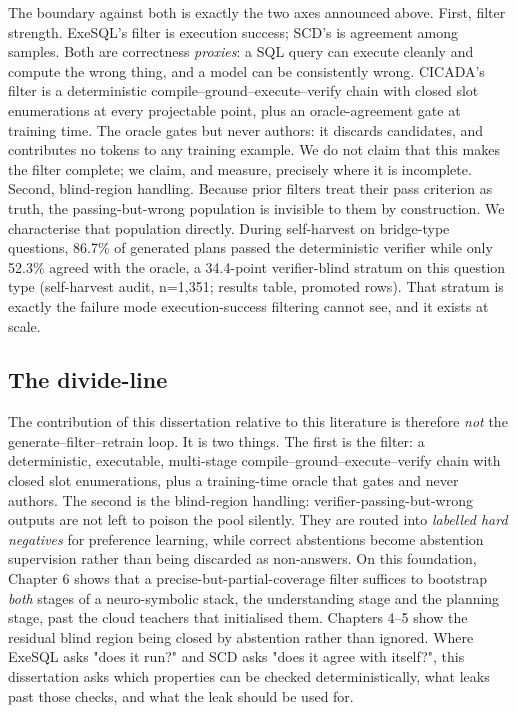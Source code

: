 \documentclass[10pt]{article} %
\begin{document}
The boundary against both is exactly the two axes announced above. First, filter strength. ExeSQL's filter is execution success; SCD's is agreement among samples. Both are correctness \emph{proxies}: a SQL query can execute cleanly and compute the wrong thing, and a model can be consistently wrong. CICADA's filter is a deterministic compile--ground--execute--verify chain with closed slot enumerations at every projectable point, plus an oracle-agreement gate at training time. The oracle gates but never authors: it discards candidates, and contributes no tokens to any training example. We do not claim that this makes the filter complete; we claim, and measure, precisely where it is incomplete. Second, blind-region handling. Because prior filters treat their pass criterion as truth, the passing-but-wrong population is invisible to them by construction. We characterise that population directly. During self-harvest on bridge-type questions, 86.7\% of generated plans passed the deterministic verifier while only 52.3\% agreed with the oracle, a 34.4-point verifier-blind stratum on this question type (self-harvest audit, n=1,351; results table, promoted rows). That stratum is exactly the failure mode execution-success filtering cannot see, and it exists at scale.

\subsection{The divide-line}\label{sec:the-divide-line}

The contribution of this dissertation relative to this literature is therefore \emph{not} the generate--filter--retrain loop. It is two things. The first is the filter: a deterministic, executable, multi-stage compile--ground--execute--verify chain with closed slot enumerations, plus a training-time oracle that gates and never authors. The second is the blind-region handling: verifier-passing-but-wrong outputs are not left to poison the pool silently. They are routed into \emph{labelled hard negatives} for preference learning, while correct abstentions become abstention supervision rather than being discarded as non-answers. On this foundation, Chapter 6 shows that a precise-but-partial-coverage filter suffices to bootstrap \emph{both} stages of a neuro-symbolic stack, the understanding stage and the planning stage, past the cloud teachers that initialised them. Chapters 4--5 show the residual blind region being closed by abstention rather than ignored. Where ExeSQL asks "does it run?" and SCD asks "does it agree with itself?", this dissertation asks which properties can be checked deterministically, what leaks past those checks, and what the leak should be used for.
\end{document}
